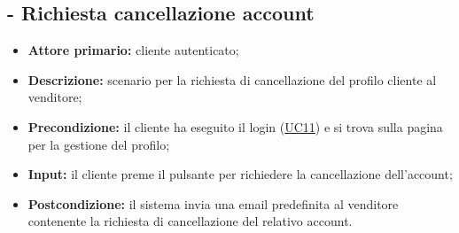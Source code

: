 \subsection{ - Richiesta cancellazione account}
\begin{itemize}
    \item \textbf{Attore primario:} cliente autenticato;
    \item \textbf{Descrizione:} scenario per la richiesta di cancellazione del profilo cliente al venditore;
    \item \textbf{Precondizione:} il cliente ha eseguito il login (\hyperref[UC11]{UC11}) e si trova sulla pagina per la gestione del profilo;
    \item \textbf{Input:} il cliente preme il pulsante per richiedere la cancellazione dell'account;
    \item \textbf{Postcondizione:} il sistema invia una email predefinita al venditore contenente la richiesta di cancellazione del relativo account.
\end{itemize}


\stepUserCase
